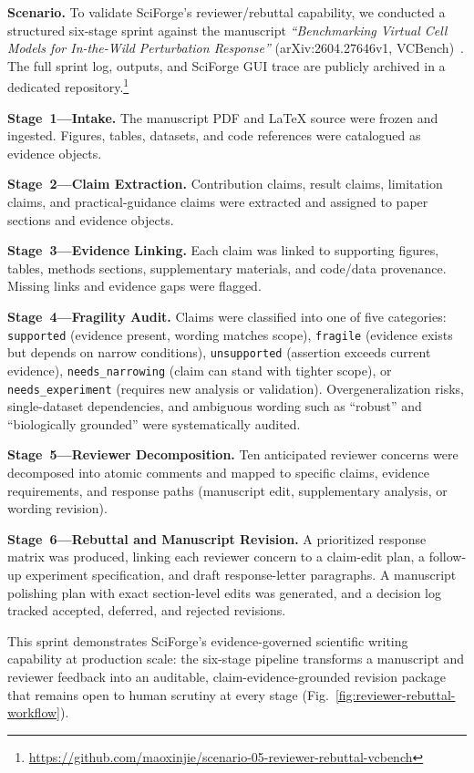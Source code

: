 \documentclass[sn-basic,Numbered,pdflatex]{sn-jnl}
\begin{document}
\textbf{Scenario.} To validate SciForge's reviewer/rebuttal capability, we conducted a structured six-stage sprint against the manuscript \textit{``Benchmarking Virtual Cell Models for In-the-Wild Perturbation Response''} (arXiv:2604.27646v1, VCBench)~\cite{vcbench2026}. The full sprint log, outputs, and SciForge GUI trace are publicly archived in a dedicated repository.\footnote{\url{https://github.com/maoxinjie/scenario-05-reviewer-rebuttal-vcbench}}

\textbf{Stage~1---Intake.} The manuscript PDF and LaTeX source were frozen and ingested. Figures, tables, datasets, and code references were catalogued as evidence objects.

\textbf{Stage~2---Claim Extraction.} Contribution claims, result claims, limitation claims, and practical-guidance claims were extracted and assigned to paper sections and evidence objects.

\textbf{Stage~3---Evidence Linking.} Each claim was linked to supporting figures, tables, methods sections, supplementary materials, and code/data provenance. Missing links and evidence gaps were flagged.

\textbf{Stage~4---Fragility Audit.} Claims were classified into one of five categories: \texttt{supported} (evidence present, wording matches scope), \texttt{fragile} (evidence exists but depends on narrow conditions), \texttt{unsupported} (assertion exceeds current evidence), \texttt{needs\_narrowing} (claim can stand with tighter scope), or \texttt{needs\_experiment} (requires new analysis or validation). Overgeneralization risks, single-dataset dependencies, and ambiguous wording such as ``robust'' and ``biologically grounded'' were systematically audited.

\textbf{Stage~5---Reviewer Decomposition.} Ten anticipated reviewer concerns were decomposed into atomic comments and mapped to specific claims, evidence requirements, and response paths (manuscript edit, supplementary analysis, or wording revision).

\textbf{Stage~6---Rebuttal and Manuscript Revision.} A prioritized response matrix was produced, linking each reviewer concern to a claim-edit plan, a follow-up experiment specification, and draft response-letter paragraphs. A manuscript polishing plan with exact section-level edits was generated, and a decision log tracked accepted, deferred, and rejected revisions.

This sprint demonstrates SciForge's evidence-governed scientific writing capability at production scale: the six-stage pipeline transforms a manuscript and reviewer feedback into an auditable, claim-evidence-grounded revision package that remains open to human scrutiny at every stage (Fig.~\ref{fig:reviewer-rebuttal-workflow}).
\end{document}
